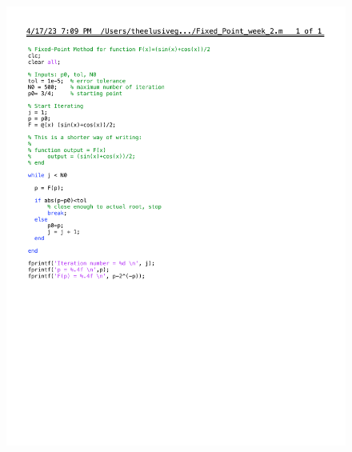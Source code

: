 \documentclass[10pt]{article}
\begin{document}
\begin{enumerate}[label=\bfseries Problem \arabic*:]
\begin{figure}[H]
\begin{minipage}{.5\textwidth}
        \includegraphics[width=\linewidth]{fixed_point_trig_1.pdf}  
    \end{minipage}%
    \begin{minipage}{.5\textwidth}
        \centering

\end{minipage}
\end{figure}
\end{enumerate}
\end{document}
